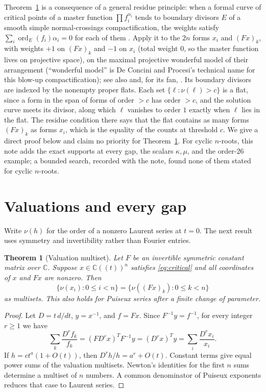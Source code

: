 \documentclass[11pt]{article}
\newtheorem{theorem}{Theorem}[section]
\theoremstyle{remark}\newtheorem{remark}[theorem]{Remark}
\newcommand{\C}{\mathbb C}\newcommand{\Q}{\mathbb Q}
\begin{document}
Theorem~\ref{thm:valuations} is a consequence of a general residue
principle: when a formal curve of critical points of a master function
$\prod f_i^{\alpha_i}$ tends to boundary divisors $E$ of a smooth
simple normal-crossings compactification, the weights satisfy
$\sum_i\operatorname{ord}_E(f_i)\alpha_i=0$ for each of them
\cite[Prop.~2.10]{SvdV}. Apply it to the $2n$ forms $x_i$ and $(Fx)_k$, with
weights $+1$ on $(Fx)_k$ and $-1$ on $x_i$ (total weight $0$, so the master
function lives on projective space), on the maximal projective wonderful
model of their arrangement \cite[\S\S3--4]{DP} (``wonderful model'' is De Concini
and Procesi's technical name for this blow-up compactification); see also
\cite[Thm.~2.5, \S\S4.1--4.2]{Fei} and, for its fan,
\cite[Prop.~3.6, Thm.~4.1]{FS}. Its boundary divisors are indexed by the
nonempty proper flats. Each set $\{\ell:\nu(\ell)>c\}$ is a flat, since a
form in the span of forms of order $>c$ has order $>c$, and the solution
curve meets its divisor, along which $\ell$ vanishes to order $1$ exactly when
$\ell$ lies in the flat. The residue condition there says that the flat
contains as many forms $(Fx)_k$ as forms $x_i$, which is the equality of the
counts at threshold $c$. We give a direct proof below and claim no priority
for Theorem~\ref{thm:valuations}. For cyclic $n$-roots, this note adds
the exact supports at every gap, the scalars $\kappa,\mu$, and the order-$26$
example; a bounded search, recorded with the note, found
none of them stated for cyclic $n$-roots.

\section{Valuations and every gap}
Write $\nu(h)$ for the order of a nonzero Laurent series at $t=0$.
The next result uses symmetry and invertibility rather than Fourier entries.

\begin{theorem}[Valuation multiset]\label{thm:valuations}
Let $F$ be an invertible symmetric constant matrix over $\C$. Suppose
$x\in\C((t))^n$ satisfies \eqref{eq:critical} and all coordinates of
$x$ and $Fx$ are nonzero. Then
\[
 \{\nu(x_i):0\le i<n\}=\{\nu((Fx)_k):0\le k<n\}
\]
as multisets. This also holds for Puiseux series after a finite change
of parameter.
\end{theorem}
\begin{proof}
Let $D=t\,d/dt$, $y=x^{-1}$, and $f=Fx$. Since $F^{-1}y=f^{-1}$,
for every integer $r\ge1$ we have
\[
 \sum_k\frac{D^rf_k}{f_k}
 =(FD^rx)^TF^{-1}y=(D^rx)^Ty
 =\sum_i\frac{D^rx_i}{x_i}.
\]
If $h=ct^a(1+O(t))$, then $D^rh/h=a^r+O(t)$. Constant terms give
equal power sums of the valuation multisets. Newton's identities for the
first $n$ sums determine a multiset of $n$ numbers. A common denominator
of Puiseux exponents reduces that case to Laurent series.
\end{proof}
\end{document}
